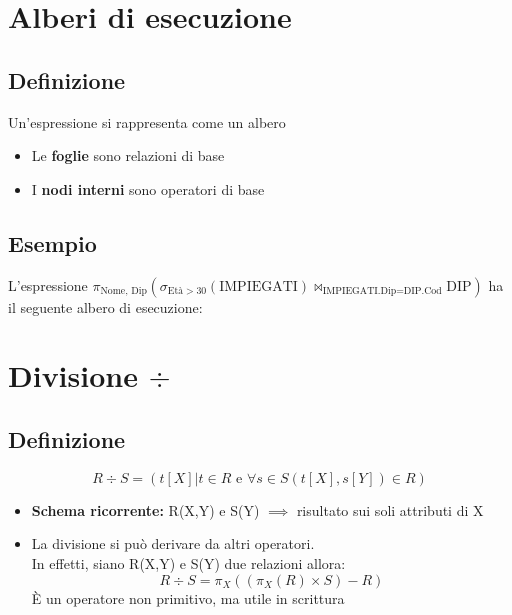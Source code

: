 \newpage
\section{Alberi di esecuzione}
\subsection{Definizione}
Un'espressione si rappresenta come un albero
\begin{itemize}
    \item Le \textbf{foglie} sono relazioni di base 
    \item I \textbf{nodi interni} sono operatori di base
\end{itemize}

\subsection{Esempio}
L'espressione $\pi_{\text{Nome, Dip}}(\sigma_{\text{Età}>30}(\text{IMPIEGATI}) \bowtie_{\text{IMPIEGATI.Dip}=\text{DIP.Cod}} \text{DIP})$ ha il seguente albero di esecuzione:\\[1em]

\begin{center}
\end{center}

\section{Divisione $\div$}
\subsection{Definizione}
$$
    R \div S = (t[X] | t \in R \text{ e } \forall s \in S (t[X],s[Y])\in R)
$$

\begin{itemize}
    \item \textbf{Schema ricorrente:} R(X,Y) e S(Y) $\implies$ risultato sui soli attributi di X
    \item La divisione si può derivare da altri operatori.\\
    In effetti, siano R(X,Y) e S(Y) due relazioni allora:\\
    $$
        R \div S = \pi_X((\pi_X(R) \times S)-R)
    $$
    È un operatore non primitivo, ma utile in scrittura
\end{itemize}


